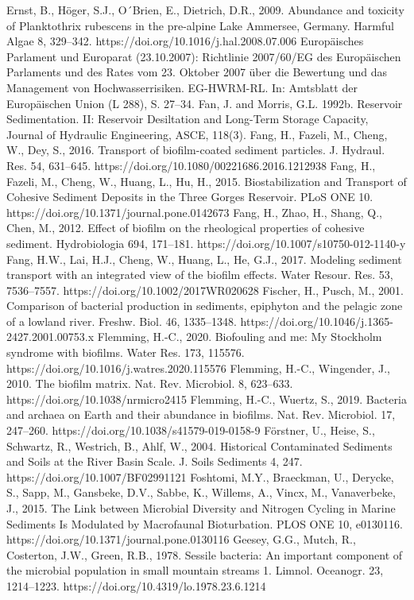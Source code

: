 \begin{thebibliography}{}
Ernst, B., Höger, S.J., O´Brien, E., Dietrich, D.R., 2009. Abundance and toxicity of Planktothrix rubescens in the pre-alpine Lake Ammersee, Germany. Harmful Algae 8, 329–342. https://doi.org/10.1016/j.hal.2008.07.006
Europäisches Parlament und Europarat (23.10.2007): Richtlinie 2007/60/EG des Europäischen Parlaments und des Rates vom 23. Oktober 2007 über die Bewertung und das Management von Hochwasserrisiken. EG-HWRM-RL. In: Amtsblatt der Europäischen Union (L 288), S. 27–34.
Fan, J. and Morris, G.L. 1992b. Reservoir Sedimentation. II: Reservoir Desiltation and Long-Term Storage Capacity, Journal of Hydraulic Engineering, ASCE, 118(3).
Fang, H., Fazeli, M., Cheng, W., Dey, S., 2016. Transport of biofilm-coated sediment particles. J. Hydraul. Res. 54, 631–645. https://doi.org/10.1080/00221686.2016.1212938
Fang, H., Fazeli, M., Cheng, W., Huang, L., Hu, H., 2015. Biostabilization and Transport of Cohesive Sediment Deposits in the Three Gorges Reservoir. PLoS ONE 10. https://doi.org/10.1371/journal.pone.0142673
Fang, H., Zhao, H., Shang, Q., Chen, M., 2012. Effect of biofilm on the rheological properties of cohesive sediment. Hydrobiologia 694, 171–181. https://doi.org/10.1007/s10750-012-1140-y
Fang, H.W., Lai, H.J., Cheng, W., Huang, L., He, G.J., 2017. Modeling sediment transport with an integrated view of the biofilm effects. Water Resour. Res. 53, 7536–7557. https://doi.org/10.1002/2017WR020628
Fischer, H., Pusch, M., 2001. Comparison of bacterial production in sediments, epiphyton and the pelagic zone of a lowland river. Freshw. Biol. 46, 1335–1348. https://doi.org/10.1046/j.1365-2427.2001.00753.x
Flemming, H.-C., 2020. Biofouling and me: My Stockholm syndrome with biofilms. Water Res. 173, 115576. https://doi.org/10.1016/j.watres.2020.115576
Flemming, H.-C., Wingender, J., 2010. The biofilm matrix. Nat. Rev. Microbiol. 8, 623–633. https://doi.org/10.1038/nrmicro2415
Flemming, H.-C., Wuertz, S., 2019. Bacteria and archaea on Earth and their abundance in biofilms. Nat. Rev. Microbiol. 17, 247–260. https://doi.org/10.1038/s41579-019-0158-9
Förstner, U., Heise, S., Schwartz, R., Westrich, B., Ahlf, W., 2004. Historical Contaminated Sediments and Soils at the River Basin Scale. J. Soils Sediments 4, 247. https://doi.org/10.1007/BF02991121
Foshtomi, M.Y., Braeckman, U., Derycke, S., Sapp, M., Gansbeke, D.V., Sabbe, K., Willems, A., Vincx, M., Vanaverbeke, J., 2015. The Link between Microbial Diversity and Nitrogen Cycling in Marine Sediments Is Modulated by Macrofaunal Bioturbation. PLOS ONE 10, e0130116. https://doi.org/10.1371/journal.pone.0130116
Geesey, G.G., Mutch, R., Costerton, J.W., Green, R.B., 1978. Sessile bacteria: An important component of the microbial population in small mountain streams 1. Limnol. Oceanogr. 23, 1214–1223. https://doi.org/10.4319/lo.1978.23.6.1214

\end{thebibliography}
